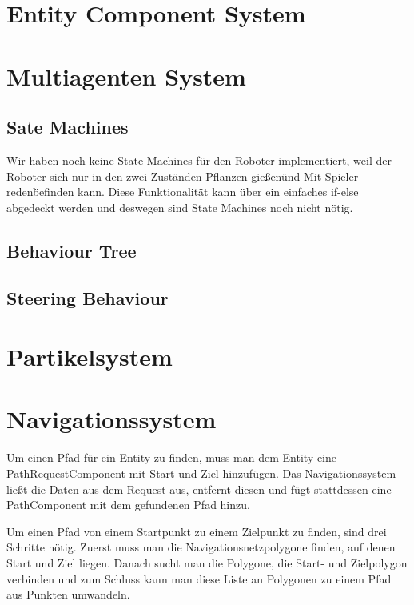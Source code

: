 
\section{Entity Component System}

\section{Multiagenten System}

\subsection{Sate Machines}

Wir haben noch keine State Machines für den Roboter implementiert, weil der Roboter sich nur in den zwei Zuständen \"Pflanzen gießen\" und \"Mit Spieler reden\" befinden kann. Diese Funktionalität kann über ein einfaches if-else abgedeckt werden und deswegen sind State Machines noch nicht nötig.

\subsection{Behaviour Tree}

\subsection{Steering Behaviour}

\section{Partikelsystem}

\section{Navigationssystem}

Um einen Pfad für ein Entity zu finden, muss man dem Entity eine PathRequestComponent mit Start und Ziel hinzufügen. Das Navigationssystem ließt die Daten aus dem Request aus, entfernt diesen und fügt stattdessen eine PathComponent mit dem gefundenen Pfad hinzu.

Um einen Pfad von einem Startpunkt zu einem Zielpunkt zu finden, sind drei Schritte nötig. Zuerst muss man die Navigationsnetzpolygone finden, auf denen Start und Ziel liegen. Danach sucht man die Polygone, die Start- und Zielpolygon verbinden und zum Schluss kann man diese Liste an Polygonen zu einem Pfad aus Punkten umwandeln.

